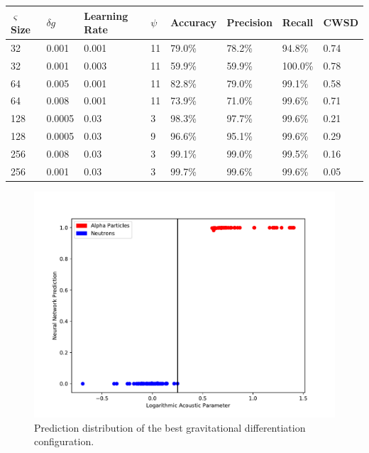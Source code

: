 \documentclass[10pt]{article}
\begin{document}
\begin{minipage}{\textwidth}
    \begin{center}
         \label{grav_overview}
        \begin{tabular}{|l|l|l|l|l|l|l|l|}
            \hline
            $\varsigma$ Size & $\delta g$ & Learning Rate & $\psi$ & Accuracy & Precision & Recall & CWSD \\
            \hline
            32 & 0.001 & 0.001 & 11 & 79.0\% & 78.2\% & 94.8\% & 0.74 \\
            \hline
            32 & 0.001 & 0.003 & 11 & 59.9\% & 59.9\% & 100.0\% & 0.78 \\
            \hline
            64 & 0.005 & 0.001 & 11 & 82.8\% & 79.0\% & 99.1\% & 0.58 \\
            \hline
            64 & 0.008 & 0.001 & 11 & 73.9\% & 71.0\% & 99.6\% & 0.71 \\
            \hline
            128 & 0.0005 & 0.03 & 3 & 98.3\% & 97.7\% & 99.6\% & 0.21 \\
            \hline
            128 & 0.0005 & 0.03 & 9 & 96.6\% & 95.1\% & 99.6\% & 0.29 \\
            \hline
            256 & 0.008 & 0.03 & 3 & 99.1\% & 99.0\% & 99.5\% & 0.16 \\
            \hline
            256 & 0.001 & 0.03 & 3 & 99.7\% & 99.6\% & 99.6\% & 0.05 \\
            \hline
        \end{tabular}
    \end{center}
\end{minipage}

\begin{figure}[h]
    \centering
    \includegraphics[width=\textwidth]{grav_grid_search}
    \caption{\label{grav_grid_search} Prediction distribution of the best gravitational differentiation configuration.}
\end{figure}
\end{document}
